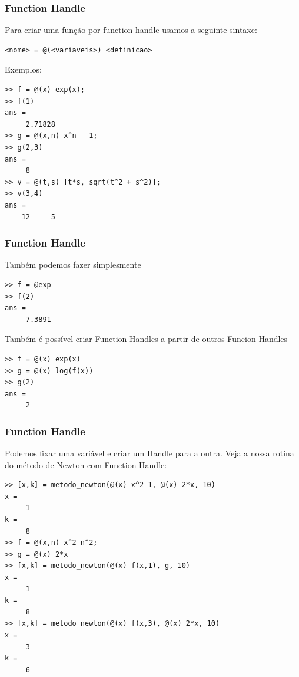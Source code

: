 \documentclass{beamer}
\newcommand{\ssiz}{\scriptsize}
\begin{document}
\begin{frame}[fragile]
 \frametitle{Function Handle}

Para criar uma fun\c{c}\~ao por function handle usamos a seguinte sintaxe:
\pause

\begin{verbatim}
<nome> = @(<variaveis>) <definicao>
\end{verbatim}
\pause
Exemplos:
{\scriptsize
\begin{verbatim}
>> f = @(x) exp(x);
>> f(1)
ans =
     2.71828
>> g = @(x,n) x^n - 1;
>> g(2,3)
ans =
     8
>> v = @(t,s) [t*s, sqrt(t^2 + s^2)];
>> v(3,4)
ans =
    12     5
\end{verbatim}}

\end{frame}

\begin{frame}[fragile]
\frametitle{Function Handle}

Tamb\'em podemos fazer simplesmente

{\ssiz
\begin{verbatim}
>> f = @exp
>> f(2)
ans =
     7.3891
\end{verbatim}
}

\pause

Tamb\'em \'e poss\'ivel criar Function Handles a partir de outros Funcion Handles

{\ssiz
\begin{verbatim}
>> f = @(x) exp(x)
>> g = @(x) log(f(x))
>> g(2)
ans =
     2
\end{verbatim}
}

\end{frame}

\begin{frame}[fragile]
\frametitle{Function Handle}

Podemos fixar uma vari\'avel e criar um Handle para a outra.
\pause
Veja a nossa rotina do m\'etodo de Newton com Function Handle:
{\ssiz
\begin{verbatim}
>> [x,k] = metodo_newton(@(x) x^2-1, @(x) 2*x, 10)
x =
     1
k =
     8
>> f = @(x,n) x^2-n^2;
>> g = @(x) 2*x
>> [x,k] = metodo_newton(@(x) f(x,1), g, 10)
x =
     1
k =
     8
>> [x,k] = metodo_newton(@(x) f(x,3), @(x) 2*x, 10)
x =
     3
k =
     6
\end{verbatim}
}

\end{frame}


\section[Exerc\'icios]{}
\end{document}
